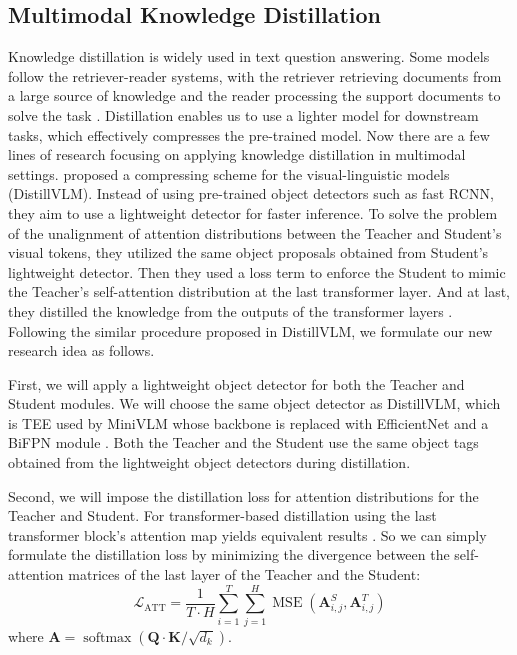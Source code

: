 \documentclass[nohyperref]{article}
\theoremstyle{plain}
\theoremstyle{definition}
\theoremstyle{remark}
\begin{document}
\subsection{Multimodal Knowledge Distillation}\label{sec:distillation_idea}

Knowledge distillation is widely used in text question answering. Some models follow the retriever-reader systems, with the retriever retrieving documents from a large source of knowledge and the reader processing the support documents to solve the task \citep{distill-text}. Distillation enables us to use a lighter model for downstream tasks, which effectively compresses the pre-trained model. Now there are a few lines of research focusing on applying knowledge distillation in multimodal settings. \citet{distill-vl} proposed a compressing scheme for the visual-linguistic models (DistillVLM). Instead of using pre-trained object detectors such as fast RCNN, they aim to use a lightweight detector for faster inference. To solve the problem of the unalignment of attention distributions between the Teacher and Student's visual tokens, they utilized the same object proposals obtained from Student's lightweight detector. Then they used a loss term to enforce the Student to mimic the Teacher’s self-attention distribution at the last transformer layer. And at last, they distilled the knowledge from the outputs of the transformer layers \citep{distill-vl}. Following the similar procedure proposed in DistillVLM, we formulate our new research idea as follows.

First, we will apply a lightweight object detector for both the Teacher and Student modules. We will choose the same object detector as DistillVLM, which is TEE used by MiniVLM \citep{minivlm} whose backbone is replaced with EfficientNet \citep{efficient-net} and a BiFPN module \citep{BiFPN}. Both the Teacher and the Student use the same object tags obtained from the lightweight object detectors during distillation. 

Second, we will impose the distillation loss for attention distributions for the Teacher and Student. For transformer-based distillation using the last transformer block’s attention map yields equivalent results \cite{minilm}. So we can simply formulate the distillation loss by minimizing the divergence between the self-attention matrices of the last layer of the Teacher and the Student:
\begin{equation}
\mathcal{L}_{\mathrm{ATT}}=\frac{1}{T \cdot H} \sum_{i=1}^T \sum_{j=1}^H \operatorname{MSE}\left(\mathbf{A}_{i, j}^S, \mathbf{A}_{i, j}^T\right)
\end{equation}
where $\mathbf{A}=\operatorname{softmax}\left(\mathbf{Q} \cdot \mathbf{K} / \sqrt{d_k}\right)$.
\end{document}
